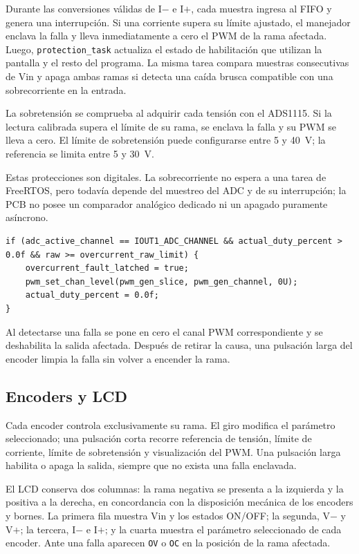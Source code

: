 \documentclass[conference]{IEEEtran}
\begin{document}
Durante las conversiones válidas de I$-$ e I$+$, cada muestra ingresa al FIFO y genera una interrupción. Si una corriente supera su límite ajustado, el manejador enclava la falla y lleva inmediatamente a cero el PWM de la rama afectada. Luego, \texttt{protection\_task} actualiza el estado de habilitación que utilizan la pantalla y el resto del programa. La misma tarea compara muestras consecutivas de Vin y apaga ambas ramas si detecta una caída brusca compatible con una sobrecorriente en la entrada.

La sobretensión se comprueba al adquirir cada tensión con el ADS1115. Si la lectura calibrada supera el límite de su rama, se enclava la falla y su PWM se lleva a cero. El límite de sobretensión puede configurarse entre 5 y 40~V; la referencia se limita entre 5 y 30~V.

Estas protecciones son digitales. La sobrecorriente no espera a una tarea de FreeRTOS, pero todavía depende del muestreo del ADC y de su interrupción; la PCB no posee un comparador analógico dedicado ni un apagado puramente asíncrono.

\begin{lstlisting}[caption={Corte inmediato desde la interrupción del ADC.}]
if (adc_active_channel == IOUT1_ADC_CHANNEL && actual_duty_percent > 0.0f && raw >= overcurrent_raw_limit) {
    overcurrent_fault_latched = true;
    pwm_set_chan_level(pwm_gen_slice, pwm_gen_channel, 0U);
    actual_duty_percent = 0.0f;
}
\end{lstlisting}

Al detectarse una falla se pone en cero el canal PWM correspondiente y se deshabilita la salida afectada. Después de retirar la causa, una pulsación larga del encoder limpia la falla sin volver a encender la rama.

\subsection{Encoders y LCD}

Cada encoder controla exclusivamente su rama. El giro modifica el parámetro seleccionado; una pulsación corta recorre referencia de tensión, límite de corriente, límite de sobretensión y visualización del PWM. Una pulsación larga habilita o apaga la salida, siempre que no exista una falla enclavada.

El LCD conserva dos columnas: la rama negativa se presenta a la izquierda y la positiva a la derecha, en concordancia con la disposición mecánica de los encoders y bornes. La primera fila muestra Vin y los estados ON/OFF; la segunda, V$-$ y V$+$; la tercera, I$-$ e I$+$; y la cuarta muestra el parámetro seleccionado de cada encoder. Ante una falla aparecen \texttt{OV} o \texttt{OC} en la posición de la rama afectada.
\end{document}
